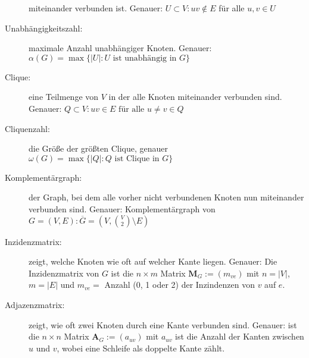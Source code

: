 \documentclass[%
a4paper, %
9pt,              %
leqno,            %
fleqn,            %
]
{scrartcl}
\begin{document}
\begin{description}
    miteinander verbunden ist. Genauer: $U \subset V: uv \notin E$ für alle $u,v
    \in U$
  \item[Unabhängigkeitszahl:] maximale Anzahl unabhängiger Knoten. Genauer:
    $\alpha(G) = \max\{|U| : U \text{ ist unabhängig in } G\}$
  \item[Clique:] eine Teilmenge von $V$ in der alle Knoten miteinander verbunden
    sind. Genauer: $Q \subset V: uv \in E \text{ für alle } u \neq v \in Q$
  \item[Cliquenzahl:] die Größe der größten Clique, genauer $\omega(G) =
    \max\{|Q| : Q \text{ ist Clique in } G\}$
  \item[Komplementärgraph:] der Graph, bei dem alle vorher nicht verbundenen
    Knoten nun miteinander verbunden sind. Genauer: Komplementärgraph von $G =
    (V,E): \overline{G} = \left( V, \binom{V}{2} \setminus E \right)$
  \item[Inzidenzmatrix:] zeigt, welche Knoten wie oft auf welcher Kante liegen.
    Genauer: Die Inzidenzmatrix von $G$ ist die $n \times m$ Matrix
    $\mathbf{M}_G := (m_{ve})$ mit $n = |V|$, $m = |E|$ und $m_{ve} = $ Anzahl
    (0, 1 oder 2) der Inzindenzen von $v$ auf $e$.
  \item[Adjazenzmatrix:] zeigt, wie oft zwei Knoten durch eine Kante verbunden
    sind. Genauer: ist die $n \times n$ Matrix $\mathbf{A}_G := (a_{uv})$ mit
    $a_{uv}$ ist die Anzahl der Kanten zwischen $u$ und $v$, wobei eine Schleife
    als doppelte Kante zählt.
    \begin{figure}[h]
      \centering
\end{figure}
\end{description}
\end{document}
